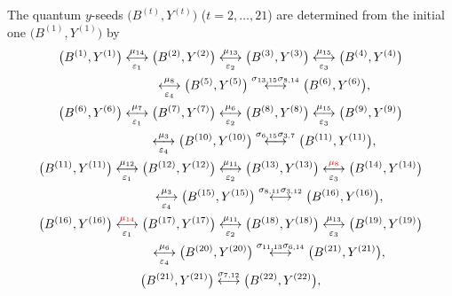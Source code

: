 \documentclass[11pt]{article}
\numberwithin{equation}{section}
\newcommand\bY{Y}
\numberwithin{equation}{section}
\begin{document}
The quantum $y$-seeds $\bigl(B^{(t)}, \bY^{(t)}\bigr)$ ($t=2,\dotsc, 21$) are
determined from the initial one $\bigl(B^{(1)},\allowbreak \bY^{(1)}\bigr) $ by
\begin{gather}
\bigl(B^{(1)}, \bY^{(1)}\bigr) \underset{\varepsilon_1}{\overset{\mu_{14}}{\longleftrightarrow}}
\bigl(B^{(2)}, \bY^{(2)}\bigr) \underset{\varepsilon_2}{\overset{\mu_{13}}{\longleftrightarrow}}
\bigl(B^{(3)}, \bY^{(3)}\bigr) \underset{\varepsilon_3}{\overset{\mu_{15}}{\longleftrightarrow}}
\bigl(B^{(4)}, \bY^{(4)}\bigr)\nonumber
\\
\phantom{\bigl(B^{(1)}, \bY^{(1)}\bigr)}{}
 \underset{\varepsilon_4}{\overset{\mu_{8}}{\longleftrightarrow}}
\bigl(B^{(5)}, \bY^{(5)}\bigr) \overset{\sigma_{13,15}\sigma_{8,14}}{\longleftrightarrow}
\bigl(B^{(6)}, \bY^{(6)}\bigr),\nonumber
\\
\bigl(B^{(6)}, \bY^{(6)}\bigr) \underset{\varepsilon_1}{\overset{\mu_{7}}{\longleftrightarrow}}
\bigl(B^{(7)}, \bY^{(7)}\bigr) \underset{\varepsilon_2}{\overset{\mu_{6}}{\longleftrightarrow}}
\bigl(B^{(8)}, \bY^{(8)}\bigr) \underset{\varepsilon_3}{\overset{\mu_{15}}{\longleftrightarrow}}
\bigl(B^{(9)}, \bY^{(9)}\bigr)\nonumber
\\
\phantom{\bigl(B^{(6)}, \bY^{(6)}\bigr)}{}
\underset{\varepsilon_4}{\overset{\mu_{3}}{\longleftrightarrow} }
\bigl(B^{(10)}, \bY^{(10)}\bigr) \overset{\sigma_{6,15}\sigma_{3,7}}{\longleftrightarrow}
\bigl(B^{(11)}, \bY^{(11)}\bigr),\nonumber
\\
\bigl(B^{(11)}, \bY^{(11)}\bigr) \underset{\varepsilon_1}{\overset{\mu_{12}}{\longleftrightarrow} }
\bigl(B^{(12)}, \bY^{(12)}\bigr) \underset{\varepsilon_2}{\overset{\mu_{11}}{\longleftrightarrow} }
\bigl(B^{(13)}, \bY^{(13)}\bigr) \underset{\varepsilon_3}{\overset{\begin{color}{red}\mu_{8}\end{color}}{\longleftrightarrow} }
\bigl(B^{(14)}, \bY^{(14)}\bigr)\nonumber
\\
\phantom{\bigl(B^{(11)}, \bY^{(11)}\bigr)}{}
 \underset{\varepsilon_4}{ \overset{\mu_{3}}{\longleftrightarrow}}
\bigl(B^{(15)}, \bY^{(15)}\bigr) \overset{\sigma_{8,11}\sigma_{3,12}}{\longleftrightarrow}
\bigl(B^{(16)}, \bY^{(16)}\bigr),\nonumber
\\
\bigl(B^{(16)}, \bY^{(16)}\bigr) \underset{\varepsilon_1}{\overset{\begin{color}{red}\mu_{14}\end{color}}{\longleftrightarrow}}
\bigl(B^{(17)}, \bY^{(17)}\bigr) \underset{\varepsilon_2}{\overset{\mu_{11}}{\longleftrightarrow}}
\bigl(B^{(18)}, \bY^{(18)}\bigr) \underset{\varepsilon_3}{\overset{\mu_{13}}{\longleftrightarrow}}
\bigl(B^{(19)}, \bY^{(19)}\bigr)\nonumber
\\
\phantom{\bigl(B^{(16)}, \bY^{(16)}\bigr) }{}
\underset{\varepsilon_4}{ \overset{\mu_{6}}{\longleftrightarrow}}
\bigl(B^{(20)}, \bY^{(20)}\bigr) \overset{\sigma_{11,13}\sigma_{6,14}}{\longleftrightarrow}
\bigl(B^{(21)}, \bY^{(21)}\bigr),\nonumber
\\
\bigl(B^{(21)}, \bY^{(21)}\bigr) \overset{\sigma_{7,12}}{\longleftrightarrow}
\bigl(B^{(22)}, \bY^{(22)}\bigr),\label{b21L}
\end{gather}
\end{document}
